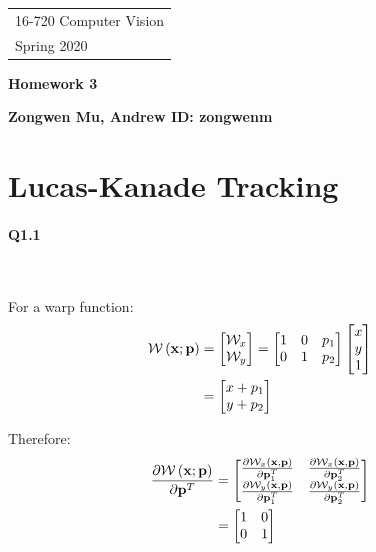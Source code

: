 \documentclass[11pt]{article} \usepackage{fullpage} \usepackage{graphicx} \usepackage{epstopdf} \usepackage{color} \usepackage{psfrag} \usepackage{pdfsync}\usepackage{indentfirst}\usepackage{subfigure}\usepackage{float}\usepackage[section]{placeins}
\begin{document}
{\parindent 0pt \begin{tabular}[t]{l} 16-720 Computer Vision \\ Spring 2020 \end{tabular}}%
\parindent 0pt \parskip 8pt
\begin{center} \large\bf Homework 3 \end{center}
\begin{center} \large\bf Zongwen Mu, Andrew ID: zongwenm \end{center}
\bigskip


\section{Lucas-Kanade Tracking}

\setlength{\parindent}{2em}  

\paragraph{Q1.1}~{}

For a warp function:
\begin{align}
	\mathcal{W}\left(\bold{x}; \bold{p}\right) & = 
	\begin{bmatrix}
	\mathcal{W}_x \\
	\mathcal{W}_y
	\end{bmatrix}
	= \begin{bmatrix}
	1 & 0 & p_1 \\
	0 & 1 & p_2
	\end{bmatrix}
	\begin{bmatrix}
	x \\ y \\ 1
	\end{bmatrix} \\
	& = \begin{bmatrix}
	x + p_1 \\ y + p_2
	\end{bmatrix}
\end{align}

Therefore:
\begin{align}
	\frac{\partial{\mathcal{W}\left(\bold{x}; \bold{p}\right)}}{\partial{\bold{p}^{T}}} & =
	\begin{bmatrix}
		\frac{\partial{\mathcal{W}_{x}\left(\bold{x}, \bold{p}\right)}}{\partial{\bold{p}_{1}^{T}}} & \frac{\partial{\mathcal{W}_{x}\left(\bold{x}, \bold{p}\right)}}{\partial{\bold{p}_{2}^{T}}} \\
		\frac{\partial{\mathcal{W}_{y}\left(\bold{x}, \bold{p}\right)}}{\partial{\bold{p}_{1}^{T}}} & \frac{\partial{\mathcal{W}_{y}\left(\bold{x}, \bold{p}\right)}}{\partial{\bold{p}_{2}^{T}}}	
	\end{bmatrix} \\
	& =
	\begin{bmatrix}
		1 & 0 \\
		0 & 1
	\end{bmatrix}
\end{align}
\end{document}
